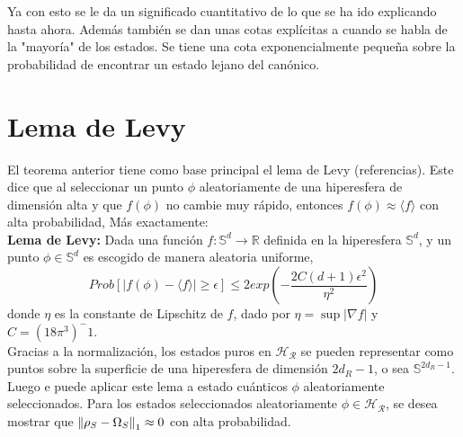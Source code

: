 Ya con esto se le da un significado cuantitativo de lo que se ha ido explicando hasta ahora. Además también se dan unas cotas explícitas a cuando se habla de la "mayoría" de los estados. Se tiene una cota exponencialmente pequeña  sobre la probabilidad de encontrar un estado lejano del canónico.\\ %
\section{Lema de Levy}
El teorema anterior tiene como base principal el lema de Levy (referencias). Este dice que al seleccionar un punto $\phi$ aleatoriamente de una hiperesfera de dimensión alta y que $f(\phi)$ no cambie muy rápido, entonces $f(\phi) \approx \langle f \rangle $ con alta probabilidad, Más exactamente:\\

\textbf{Lema de Levy:} Dada una función $f: \mathbb{S}^d \to \mathbb{R} $ definida en la hiperesfera $\mathbb{S}^d$, y un punto $\phi \in \mathbb{S}^d $ es escogido de manera aleatoria uniforme, 
\begin{equation}
Prob[|f(\phi)- \langle f \rangle| \ge \epsilon ] \le 2exp(-\frac{2C(d+1)\epsilon^2}{\eta^2})
\end{equation}
donde $\eta$ es la constante de Lipschitz de $f$, dado por $\eta= \sup|\nabla f|$ y $C=(18\pi^3)^-1$.\\

Gracias a la normalización, los estados puros en $\mathcal{H_{R}}$ se pueden representar como puntos sobre la superficie de una hiperesfera de dimensión $2d_{R}-1$, o sea  $\mathbb{S}^{2d_{R}-1}$. Luego e puede aplicar este lema a estado cuánticos $\phi$ aleatoriamente seleccionados. Para los estados seleccionados aleatoriamente $\phi \in \mathcal{H_{R}}$, se desea mostrar que $\norm{\rho_{S}- \Omega_{S}}_{1} \approx 0$ con alta probabilidad.\\

